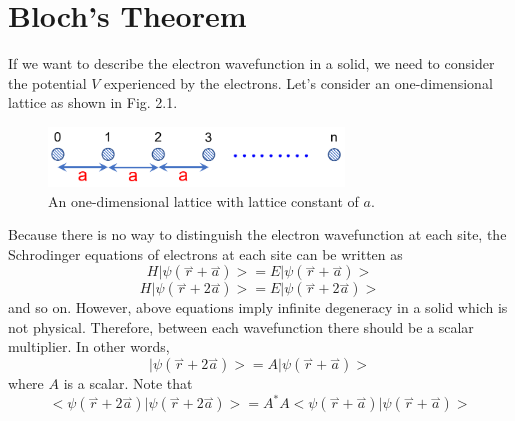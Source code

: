 \section{Bloch's Theorem}
If we want to describe the electron wavefunction in a solid, we need to consider the potential $V$ experienced by the electrons. Let's consider an one-dimensional lattice as shown in Fig. 2.1.
\begin{figure}[tbp]
\includegraphics[width=0.7\textwidth]{figures/Fig2_1}
\centering
\caption{\small An one-dimensional lattice with lattice constant of $a$.}
\end{figure} Because there is no way to distinguish the electron wavefunction at each site, the Schrodinger equations of electrons at each site can be written as \begin{equation}
    H\big|\psi\left(\overset{\rightharpoonup}{r}+\overset{\rightharpoonup}{a}\right)\big> = E\big|\psi\left(\overset{\rightharpoonup}{r}+\overset{\rightharpoonup}{a}\right)\big>
\end{equation} \begin{equation}
    H\big|\psi\left(\overset{\rightharpoonup}{r}+2\overset{\rightharpoonup}{a}\right)\big> = E\big|\psi\left(\overset{\rightharpoonup}{r}+2\overset{\rightharpoonup}{a}\right)\big>
\end{equation} and so on. However, above equations imply infinite degeneracy in a solid which is not physical. Therefore, between each wavefunction there should be a scalar multiplier. In other words, \begin{equation}
    \big|\psi\left(\overset{\rightharpoonup}{r}+2\overset{\rightharpoonup}{a}\right)\big> = A\big|\psi\left(\overset{\rightharpoonup}{r}+\overset{\rightharpoonup}{a}\right)\big>
\end{equation} where $A$ is a scalar. Note that \begin{equation}
    \big<\psi\left(\overset{\rightharpoonup}{r}+2\overset{\rightharpoonup}{a}\right)\big|\psi\left(\overset{\rightharpoonup}{r}+2\overset{\rightharpoonup}{a}\right)\big> = A^{*}A\big<\psi\left(\overset{\rightharpoonup}{r}+\overset{\rightharpoonup}{a}\right)\big|\psi\left(\overset{\rightharpoonup}{r}+\overset{\rightharpoonup}{a}\right)\big>\nonumber
\end{equation} \begin{equation}

\end{equation}

